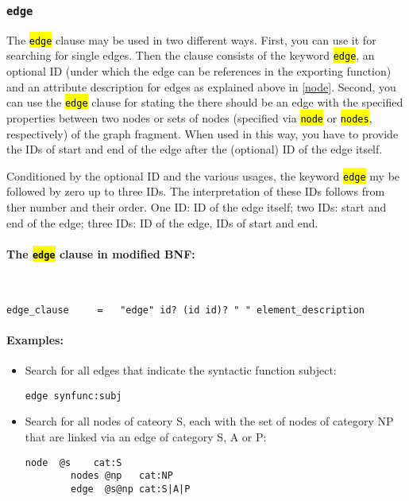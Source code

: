 \documentclass[12pt]{scrartcl}
\newcommand{\code}[1]{\hl{\texttt{#1}}}
\begin{document}
\subsubsection{\texttt{edge}}\label{edge}

The \code{edge} clause may be used in two different ways.
First, you can use it for searching for single edges.
Then the clause consists of the keyword \code{edge}, an optional ID (under which the edge can be references in the exporting function) and an attribute description for edges as explained above in \ref{node}.
Second, you can use the \code{edge} clause for stating the there should be an edge with the specified properties between two nodes or sets of nodes (specified via \code{node} or \code{nodes}, respectively) of the graph fragment.
When used in this way, you have to provide the IDs of start and end of the edge after the (optional) ID of the edge itself.

Conditioned by the optional ID and the various usages, the keyword \code{edge} my be followed by zero up to three IDs.
The interpretation of these IDs follows from ther number and their order.
One ID: ID of the edge itself; two IDs: start and end of the edge; three IDs: ID of the edge, IDs of start and end.

\paragraph*{The \code{edge} clause in modified BNF:}
~
\begin{lstlisting}
edge_clause     =   "edge" id? (id id)? " " element_description
\end{lstlisting}

\paragraph*{Examples:}
\begin{itemize}
	\item Search for all edges that indicate the syntactic function subject:
	\begin{lstlisting}[gobble=8,aboveskip=.6em,belowskip=.2em]
		edge synfunc:subj
	\end{lstlisting}
	\item Search for all nodes of cateory S, each with the set of nodes of category NP that are linked via an edge of category S, A or P:
	\begin{lstlisting}[gobble=8,aboveskip=.6em,belowskip=.2em]
		node  @s    cat:S
		nodes @np   cat:NP
		edge  @s@np cat:S|A|P
	\end{lstlisting}
\end{itemize}
\end{document}
